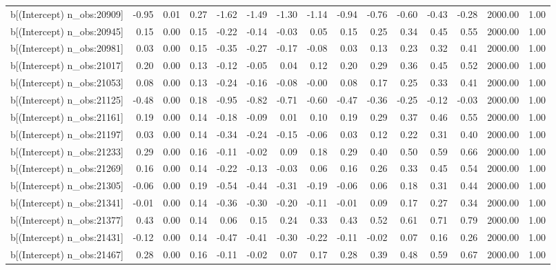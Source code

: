\begin{table}[ht]
\begin{tabular}{rrrrrrrrrrrrrrr}
  b[(Intercept) n\_obs:20909] & -0.95 & 0.01 & 0.27 & -1.62 & -1.49 & -1.30 & -1.14 & -0.94 & -0.76 & -0.60 & -0.43 & -0.28 & 2000.00 & 1.00 \\ 
  b[(Intercept) n\_obs:20945] & 0.15 & 0.00 & 0.15 & -0.22 & -0.14 & -0.03 & 0.05 & 0.15 & 0.25 & 0.34 & 0.45 & 0.55 & 2000.00 & 1.00 \\ 
  b[(Intercept) n\_obs:20981] & 0.03 & 0.00 & 0.15 & -0.35 & -0.27 & -0.17 & -0.08 & 0.03 & 0.13 & 0.23 & 0.32 & 0.41 & 2000.00 & 1.00 \\ 
  b[(Intercept) n\_obs:21017] & 0.20 & 0.00 & 0.13 & -0.12 & -0.05 & 0.04 & 0.12 & 0.20 & 0.29 & 0.36 & 0.45 & 0.52 & 2000.00 & 1.00 \\ 
  b[(Intercept) n\_obs:21053] & 0.08 & 0.00 & 0.13 & -0.24 & -0.16 & -0.08 & -0.00 & 0.08 & 0.17 & 0.25 & 0.33 & 0.41 & 2000.00 & 1.00 \\ 
  b[(Intercept) n\_obs:21125] & -0.48 & 0.00 & 0.18 & -0.95 & -0.82 & -0.71 & -0.60 & -0.47 & -0.36 & -0.25 & -0.12 & -0.03 & 2000.00 & 1.00 \\ 
  b[(Intercept) n\_obs:21161] & 0.19 & 0.00 & 0.14 & -0.18 & -0.09 & 0.01 & 0.10 & 0.19 & 0.29 & 0.37 & 0.46 & 0.55 & 2000.00 & 1.00 \\ 
  b[(Intercept) n\_obs:21197] & 0.03 & 0.00 & 0.14 & -0.34 & -0.24 & -0.15 & -0.06 & 0.03 & 0.12 & 0.22 & 0.31 & 0.40 & 2000.00 & 1.00 \\ 
  b[(Intercept) n\_obs:21233] & 0.29 & 0.00 & 0.16 & -0.11 & -0.02 & 0.09 & 0.18 & 0.29 & 0.40 & 0.50 & 0.59 & 0.66 & 2000.00 & 1.00 \\ 
  b[(Intercept) n\_obs:21269] & 0.16 & 0.00 & 0.14 & -0.22 & -0.13 & -0.03 & 0.06 & 0.16 & 0.26 & 0.33 & 0.45 & 0.54 & 2000.00 & 1.00 \\ 
  b[(Intercept) n\_obs:21305] & -0.06 & 0.00 & 0.19 & -0.54 & -0.44 & -0.31 & -0.19 & -0.06 & 0.06 & 0.18 & 0.31 & 0.44 & 2000.00 & 1.00 \\ 
  b[(Intercept) n\_obs:21341] & -0.01 & 0.00 & 0.14 & -0.36 & -0.30 & -0.20 & -0.11 & -0.01 & 0.09 & 0.17 & 0.27 & 0.34 & 2000.00 & 1.00 \\ 
  b[(Intercept) n\_obs:21377] & 0.43 & 0.00 & 0.14 & 0.06 & 0.15 & 0.24 & 0.33 & 0.43 & 0.52 & 0.61 & 0.71 & 0.79 & 2000.00 & 1.00 \\ 
  b[(Intercept) n\_obs:21431] & -0.12 & 0.00 & 0.14 & -0.47 & -0.41 & -0.30 & -0.22 & -0.11 & -0.02 & 0.07 & 0.16 & 0.26 & 2000.00 & 1.00 \\ 
  b[(Intercept) n\_obs:21467] & 0.28 & 0.00 & 0.16 & -0.11 & -0.02 & 0.07 & 0.17 & 0.28 & 0.39 & 0.48 & 0.59 & 0.67 & 2000.00 & 1.00 \\ 

\end{tabular}
\end{table}
